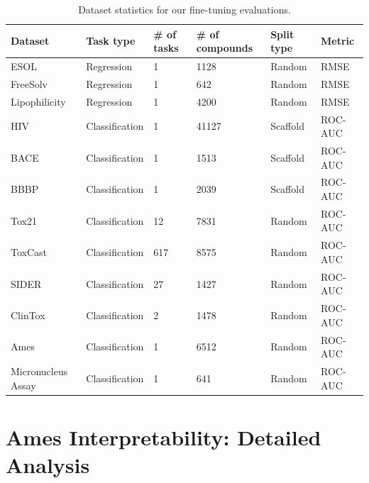 \documentclass{article} %
\begin{document}
\begin{table}[h]
\begin{tabular}{llllll}
\toprule

Dataset       & Task type      & \# of tasks & \# of compounds & Split type & Metric  \\ \midrule
ESOL          & Regression     & 1              & 1128               & Random     & RMSE    \\
FreeSolv      & Regression     & 1              & 642                & Random     & RMSE    \\
Lipophilicity & Regression     & 1              & 4200               & Random     & RMSE    \\ \midrule
HIV           & Classification & 1              & 41127              & Scaffold   & ROC-AUC \\
BACE          & Classification & 1              & 1513               & Scaffold   & ROC-AUC \\ BBBP          & Classification & 1              & 2039               & Scaffold   & ROC-AUC \\
\midrule
Tox21         & Classification & 12             & 7831               & Random     & ROC-AUC \\
ToxCast       & Classification & 617            & 8575               & Random     & ROC-AUC \\
SIDER         & Classification & 27             & 1427               & Random     & ROC-AUC \\
ClinTox       & Classification & 2              & 1478               & Random     & ROC-AUC \\
\midrule
Ames          & Classification & 1              & 6512               & Random     & ROC-AUC \\
Micronucleus Assay & Classification & 1              & 641                & Random     & ROC-AUC

    \\ \bottomrule
    
\end{tabular}
\caption{Dataset statistics for our fine-tuning evaluations.}

\end{table}

\section{Ames Interpretability: Detailed Analysis}\label{sec:app-captum-ames}


\end{document}
